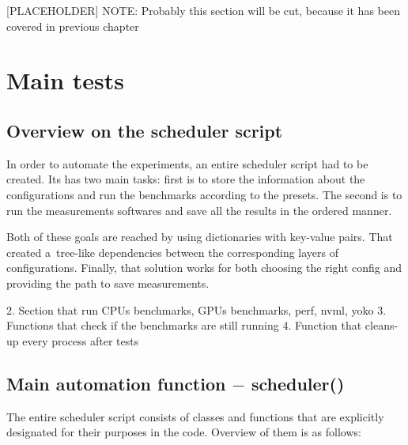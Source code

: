 [PLACEHOLDER] NOTE: Probably this section will be cut, because it has been
covered in previous chapter

\section{Main tests}

\subsection{Overview on the scheduler script}

In order to automate the experiments, an entire scheduler script had to be
created. Its has two main tasks: first is to store the information about the
configurations and run the benchmarks according to the presets. The second
is to run the measurements softwares and save all the results in the ordered
manner.

Both of these goals are reached by using dictionaries with key-value pairs.
That created a~tree-like dependencies between the corresponding layers of
configurations. Finally, that solution works for both choosing the right
config and providing the path to save measurements.


2. Section that run CPUs benchmarks, GPUs benchmarks, perf, nvml, yoko
3. Functions that check if the benchmarks are still running
4. Function that cleans-up every process after tests

\newpage

\subsection{Main automation function $-$ scheduler()}


The entire scheduler script consists of classes and functions that are
explicitly designated for their purposes in the code. Overview of them is
as follows:

